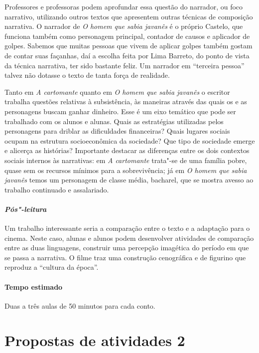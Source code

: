 \documentclass{extarticle}
\begin{document}
Professores e professoras podem aprofundar essa questão do narrador, ou
foco narrativo, utilizando outros textos que apresentem outras técnicas
de composição narrativa. O narrador de \textit{\emph{O homem que sabia
javanês}} é o próprio Castelo, que funciona também como personagem
principal, contador de causos e aplicador de golpes. Sabemos que muitas
pessoas que vivem de aplicar golpes também gostam de contar suas
façanhas, daí a escolha feita por Lima Barreto, do ponto de vista da
técnica narrativa, ter sido bastante feliz. Um narrador em ``terceira
pessoa'' talvez não dotasse o texto de tanta força de realidade.

Tanto em {\textit{A cartomante}} quanto em \textit{\emph{O homem
que sabia javanês}} o escritor trabalha questões relativas à
subsistência, às maneiras através das quais os e as personagens buscam
ganhar dinheiro. Esse é um eixo temático que pode ser trabalhado com os
alunos e alunas. Quais as estratégias utilizadas pelos personagens para
driblar as dificuldades financeiras? Quais lugares sociais ocupam na
estrutura socioeconômica da sociedade? Que tipo de sociedade emerge e
alicerça as histórias? Importante destacar as diferenças entre os dois
contextos sociais internos às narrativas: em \textit{\emph{A
cartomante}} trata"-se de uma família pobre, quase sem os recursos
mínimos para a sobrevivência; já em \textit{\emph{O homem que sabia
javanês}} temos um personagem de classe média, bacharel, que se mostra
avesso ao trabalho continuado e assalariado.

\paragraph{\textit{Pós"-leitura}}

Um trabalho interessante seria a comparação entre o texto e a
adaptação para o cinema. Neste caso, alunas e alunos podem desenvolver
atividades de comparação entre as duas linguagens, construir uma
percepção imagética do período em que se passa a narrativa. O filme traz
uma construção cenográfica e de figurino que reproduz a ``cultura da
época''.

\paragraph{Tempo estimado} Duas a três aulas de 50 minutos para cada conto.

\section{Propostas de atividades 2}
\end{document}
